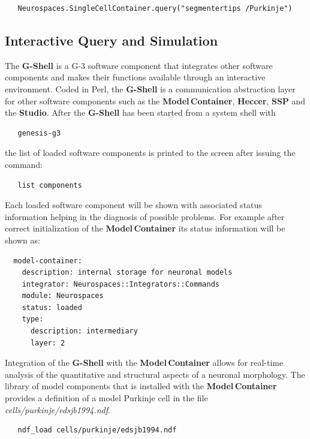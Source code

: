 \documentclass[12pt]{article}
\begin{document}
{\footnotesize
\begin{verbatim}
   Neurospaces.SingleCellContainer.query("segmentertips /Purkinje")
\end{verbatim}
}

\subsection{Interactive Query and Simulation}

The {\bf G-Shell} is a G-3 software component that integrates other
software components and makes their functions available through an
interactive environment.  Coded in Perl, the {\bf G-Shell} is a
communication abstraction layer for other software components such as
the {\bf Model\,Container}, {\bf Heccer}, {\bf SSP} and the {\bf
  Studio}.  After the {\bf G-Shell} has been started from a system
shell with

{\footnotesize
\begin{verbatim}
   genesis-g3
\end{verbatim}
}

the list of loaded software components is printed to the screen after
issuing the command:

{\footnotesize
\begin{verbatim}
   list components
\end{verbatim}
}

Each loaded software component will be shown with associated status
information helping in the diagnosis of possible problems.  For
example after correct initialization of the {\bf Model\,Container} its
status information will be shown as:

{\footnotesize
\begin{verbatim}
  model-container:
    description: internal storage for neuronal models
    integrator: Neurospaces::Integrators::Commands
    module: Neurospaces
    status: loaded
    type:
      description: intermediary
      layer: 2
\end{verbatim}
}

Integration of the {\bf G-Shell} with the {\bf Model\,Container}
allows for real-time analysis of the quantitative and structural
aspects of a neuronal morphology.  The library of model components
that is installed with the {\bf Model\,Container} provides a
definition of a model Purkinje cell in the file {\it
  cells/purkinje/edsjb1994.ndf}.  {\footnotesize
\begin{verbatim}
   ndf_load cells/purkinje/edsjb1994.ndf
\end{verbatim}
}
\end{document}
